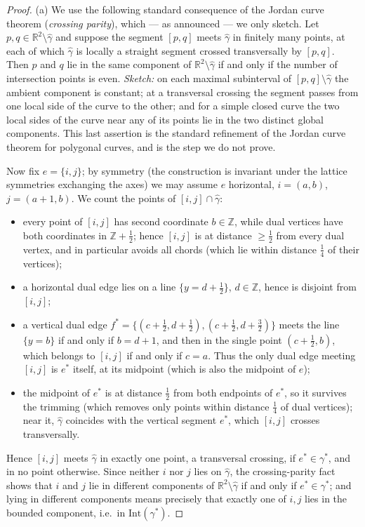 \documentclass[11pt]{article}
\theoremstyle{plain}
\theoremstyle{definition}
\theoremstyle{remark}
\newcommand{\Z}{\mathbb{Z}}
\newcommand{\R}{\mathbb{R}}
\newcommand{\Intr}{\mathrm{Int}}    %
\begin{document}
\begin{proof}
(a) We use the following standard consequence of the Jordan curve theorem
(\emph{crossing parity}), which --- as announced --- we only sketch. Let
$p,q\in\R^2\setminus\widehat\gamma$ and suppose the segment $[p,q]$ meets
$\widehat\gamma$ in finitely many points, at each of which $\widehat\gamma$
is locally a straight segment crossed transversally by $[p,q]$. Then $p$ and
$q$ lie in the same component of $\R^2\setminus\widehat\gamma$ if and only
if the number of intersection points is even. \emph{Sketch:} on each maximal
subinterval of $[p,q]\setminus\widehat\gamma$ the ambient component is
constant; at a transversal crossing the segment passes from one local side
of the curve to the other; and for a simple closed curve the two local sides
of the curve near any of its points lie in the two distinct global
components. This last assertion is the standard refinement of the Jordan
curve theorem for polygonal curves, and is the step we do not prove.

Now fix $e=\{i,j\}$; by symmetry (the construction is invariant under the
lattice symmetries exchanging the axes) we may assume $e$ horizontal,
$i=(a,b)$, $j=(a+1,b)$. We count the points of $[i,j]\cap\widehat\gamma$:
\begin{itemize}
  \item every point of $[i,j]$ has second coordinate $b\in\Z$, while dual
        vertices have both coordinates in $\Z+\tfrac12$; hence $[i,j]$ is at
        distance $\ge\tfrac12$ from every dual vertex, and in particular
        avoids all chords (which lie within distance $\tfrac14$ of their
        vertices);
  \item a horizontal dual edge lies on a line $\{y=d+\tfrac12\}$, $d\in\Z$,
        hence is disjoint from $[i,j]$;
  \item a vertical dual edge
        $f^*=\{(c+\tfrac12,d+\tfrac12),(c+\tfrac12,d+\tfrac32)\}$ meets the
        line $\{y=b\}$ if and only if $b=d+1$, and then in the single point
        $(c+\tfrac12,b)$, which belongs to $[i,j]$ if and only if $c=a$.
        Thus the only dual edge meeting $[i,j]$ is $e^*$ itself, at its
        midpoint (which is also the midpoint of $e$);
  \item the midpoint of $e^*$ is at distance $\tfrac12$ from both endpoints
        of $e^*$, so it survives the trimming (which removes only points
        within distance $\tfrac14$ of dual vertices); near it,
        $\widehat\gamma$ coincides with the vertical segment $e^*$, which
        $[i,j]$ crosses transversally.
\end{itemize}
Hence $[i,j]$ meets $\widehat\gamma$ in exactly one point, a transversal
crossing, if $e^*\in\gamma^*$, and in no point otherwise. Since neither
$i$ nor $j$ lies on $\widehat\gamma$, the crossing-parity fact shows that
$i$ and $j$ lie in different components of $\R^2\setminus\widehat\gamma$ if
and only if $e^*\in\gamma^*$; and lying in different components means
precisely that exactly one of $i,j$ lies in the bounded component, i.e.\ in
$\Intr(\gamma^*)$.


\end{proof}
\end{document}
